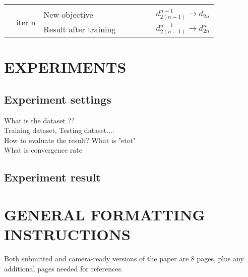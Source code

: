 \documentclass[twoside]{article}
\begin{document}
\begin{table*}[t]
\begin{tabular}{|l|l|l|l|l|l|l|l|}
                                                                              &                         &                       &                         &                          &                            &  &                                            \\ \cline{2-8} 
                                                                              & \multirow{2}{*}{iter n} & New objective         &                         &                          &                            &  & $d_{2(n-1)}^{n-1} \rightarrow d_{2n}$     \\ \cline{3-8} 
                                                                              &                         & Result after training &                         &                          &                            &  & $d_{2(n-1)}^{n-1} \rightarrow d_{2n}^{n}$ \\ \hline
\end{tabular}
\end{table*}

\section{EXPERIMENTS}


\subsection{Experiment settings}

	
What is the dataset ??\\
Training dataset, Testing dataset.... \\

How to evaluate the result?
What is "etot" \\
What is convergence rate \\

	

\subsection{Experiment result}



\section{GENERAL FORMATTING INSTRUCTIONS}



Both submitted and camera-ready versions of the paper are 8 pages,
plus any additional pages needed for references.
\end{document}
